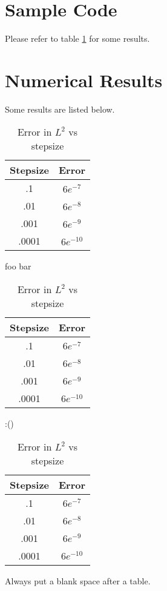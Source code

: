 \documentclass[11pt]{article}
\numberwithin{equation}{section}
\theoremstyle{definition}
\begin{document}
\section{Sample Code}
\lstset{caption=Basic Scheme}

\lstset{caption=Lubich Scheme}

Please refer to table \ref{some_table} for some results.
\section{Numerical Results}
Some results are listed below.
\begin{table}[H]
  \caption{Error in $L^2$ vs stepsize}
  \label{some_table}
  \begin{center}
  \begin{tabular}{|c|c|}
  \hline
  Stepsize & Error \\ \hline
  .1 & $6e^{-7}$ \\ \hline
  .01 & $6e^{-8}$ \\ \hline
  .001 & $6e^{-9}$ \\ \hline
  .0001 & $6e^{-10}$ \\
  \hline
  \end{tabular}
  \end{center}
\end{table}
foo bar
\begin{table}[H]
  \caption{Error in $L^2$ vs stepsize}
  \label{some_table_2}
  \begin{center}
  \begin{tabular}{|c|c|}
  \hline
  Stepsize & Error \\ \hline
  .1 & $6e^{-7}$ \\ \hline
  .01 & $6e^{-8}$ \\ \hline
  .001 & $6e^{-9}$ \\ \hline
  .0001 & $6e^{-10}$ \\
  \hline
  \end{tabular}
  \end{center}
\end{table}
:()
\begin{table}[H]
  \caption{Error in $L^2$ vs stepsize}
  \label{some_table_3}
  \begin{center}
  \begin{tabular}{|c|c|}
  \hline
  Stepsize & Error \\ \hline
  .1 & $6e^{-7}$ \\ \hline
  .01 & $6e^{-8}$ \\ \hline
  .001 & $6e^{-9}$ \\ \hline
  .0001 & $6e^{-10}$ \\
  \hline
  \end{tabular}
  \end{center}
\end{table}
Always put a blank space after a table.



\end{document}
